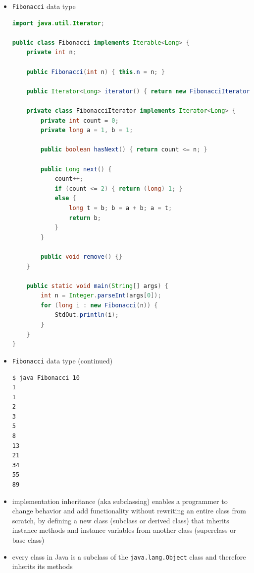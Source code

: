 \documentclass[8pt,a4paper,compress]{beamer}
\begin{document}
\begin{frame}[fragile]
\begin{itemize}
\item \lstinline{Fibonacci} data type
\begin{lstlisting}[language=Java]
import java.util.Iterator;

public class Fibonacci implements Iterable<Long> {
    private int n;

    public Fibonacci(int n) { this.n = n; }

    public Iterator<Long> iterator() { return new FibonacciIterator(); }

    private class FibonacciIterator implements Iterator<Long> {
        private int count = 0;
        private long a = 1, b = 1;

        public boolean hasNext() { return count <= n; }

        public Long next() {
            count++;
            if (count <= 2) { return (long) 1; }
            else { 
                long t = b; b = a + b; a = t;
                return b;
            }
        }
        
        public void remove() {}
    }

    public static void main(String[] args) {
        int n = Integer.parseInt(args[0]);
        for (long i : new Fibonacci(n)) {
            StdOut.println(i);
        }
    }
}
\end{lstlisting}
\end{itemize}
\end{frame}

\begin{frame}[fragile]
\begin{itemize}
\item \lstinline{Fibonacci} data type (continued)
\begin{lstlisting}[language={}]
$ java Fibonacci 10
1
1
2
3
5
8
13
21
34
55
89
\end{lstlisting}

\item implementation inheritance (aka subclassing) enables a programmer to change behavior and add functionality without rewriting an entire class from scratch, by defining a new class (subclass or derived class) that inherits instance methods and instance variables from another class (superclass or base class)

\item every class in Java is a subclass of the \lstinline{java.lang.Object} class and therefore inherits its methods
\end{itemize}
\end{frame}
\end{document}
